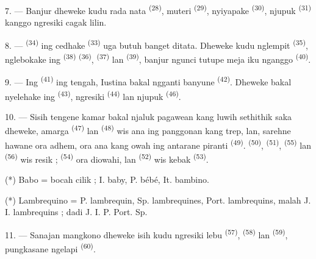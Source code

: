 7. --- Banjur dheweke kudu rada nata 
\textsuperscript{(28)}, muteri  \textsuperscript{(29)},
nyiyapake  \textsuperscript{(30)}, njupuk
 \textsuperscript{(31)} kanggo ngresiki cagak lilin.

\VUsaut{5.0mm}
\VUsaut{3.0mm}

8. ---  \textsuperscript{(34)} ing cedhake
 \textsuperscript{(33)} uga butuh banget ditata.
Dheweke kudu nglempit  \textsuperscript{(35)},
nglebokake ing  \textsuperscript{(38)}
  \textsuperscript{(36)},
 \textsuperscript{(37)} lan 
\textsuperscript{(39)}, banjur ngunci tutupe meja iku nganggo
 \textsuperscript{(40)}.

9. --- Ing  \textsuperscript{(41)} ing tengah,
Iustina bakal ngganti banyune  \textsuperscript{(42)}.
Dheweke bakal nyelehake  ing 
\textsuperscript{(43)}, ngresiki 
\textsuperscript{(44)} lan njupuk 
\textsuperscript{(46)}.

10. --- Sisih tengene kamar bakal njaluk pagawean kang luwih sethithik
saka dheweke, amarga  \textsuperscript{(47)} lan
 \textsuperscript{(48)} wis ana ing panggonan kang trep,
lan, sarehne hawane ora adhem, ora ana kang owah ing antarane piranti
 \textsuperscript{(49)}. 
\textsuperscript{(50)},  \textsuperscript{(51)},
 \textsuperscript{(55)} lan 
\textsuperscript{(56)} wis resik ; 
\textsuperscript{(54)} ora diowahi, lan 
\textsuperscript{(52)} wis kebak 
\textsuperscript{(53)}.

(*) Babo = bocah cilik ; I. baby, P. bébé, It. bambino.

(*) Lambrequino = P. lambrequin, Sp. lambrequines, Port. lambrequins,
malah J. I. lambrequins ; dadi J. I. P. Port. Sp.

11. --- Sanajan mangkono dheweke isih kudu ngresiki lebu  \textsuperscript{(57)}, 
\textsuperscript{(58)} lan 
\textsuperscript{(59)}, pungkasane ngelapi 
\textsuperscript{(60)}.

